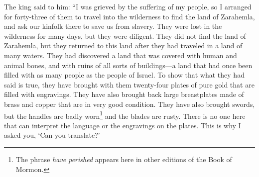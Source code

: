 The king said to him: ``I was grieved by the suffering of my people, so I arranged for forty-three of them to travel into the wilderness to find the land of Zarahemla, and ask our kinfolk there to save us from slavery. 
\bverse \iffalse And they were lost in the wilderness for the space of many days, yet they were diligent, and found not the land of Zarahemla but returned to this land, having traveled in a land among many waters, having discovered a land which was covered with bones of men, and of beasts, and was also covered with ruins of buildings of every kind, having discovered a land which had been peopled with a people who were as numerous as the hosts of Israel. \fi
They were lost in the wilderness for many days, but they were diligent. They did not find the land of Zarahemla, but they returned to this land after they had traveled in a land of many waters. They had discovered a land that was covered with human and animal bones, and with ruins of all sorts of buildings---a land that had once been filled with as many people as the people of Israel.
\bverse \iffalse And for a testimony that the things that they had said are true they have brought twenty-four plates which are filled with engravings, and they are of pure gold. \fi
To show that what they had said is true, they have brought with them twenty-four plates of pure gold that are filled with engravings.
\bverse \iffalse And behold, also, they have brought breastplates, which are large, and they are of brass and of copper, and are perfectly sound. \fi
They have also brought back large breastplates made of brass and copper that are in very good condition.
\bverse \iffalse And again, they have brought swords, the hilts thereof have perished, and the blades thereof were cankered with rust; and there is no one in the land that is able to interpret the language or the engravings that are on the plates. Therefore I said unto thee: Canst thou translate? \fi
They have also brought swords, but the handles are badly worn\footnote{The phrase \textit{have perished} appears here in other editions of the Book of Mormon.} and the blades are rusty. There is no one here that can interpret the language or the engravings on the plates. This is why I asked you, \lq Can you translate?\rq
\bverse \iffalse And I say unto thee again: Knowest thou of any one that can translate? For I am desirous that these records should be translated into our language; for, perhaps, they will give us a knowledge of a remnant of the people who have been destroyed, from whence these records came; or, perhaps, they will give us a knowledge of this very people who have been destroyed; and I am desirous to know the cause of their destruction. \fi
